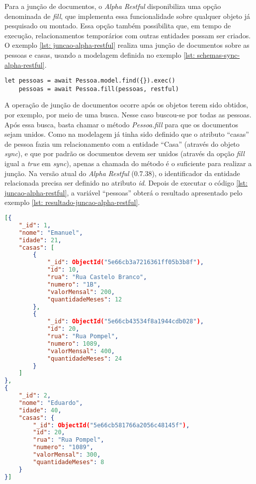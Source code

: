 Para a junção de documentos, o \textit{Alpha Restful} disponibiliza uma opção denominada de \textit{fill}, que implementa essa funcionalidade sobre qualquer objeto já pesquisado ou montado. Essa opção também possibilita que, em tempo de execução, relacionamentos temporários com outras entidades possam ser criados. O exemplo \ref{lst: juncao-alpha-restful} realiza uma junção de documentos sobre as pessoas e casas, usando a modelagem definida no exemplo \ref{lst: schemas-sync-alpha-restful}.

\begin{lstlisting}[style=ES6, caption={Junção de Documentos Com o \textit{Alpha Restful}\label{lst: juncao-alpha-restful}}]
	let pessoas = await Pessoa.model.find({}).exec()
	pessoas = await Pessoa.fill(pessoas, restful)
\end{lstlisting}

A operação de junção de documentos ocorre após os objetos terem sido obtidos, por exemplo, por meio de uma busca. Nesse caso buscou-se por todas as pessoas. Após essa busca, basta chamar o método \textit{Pessoa.fill} para que os documentos sejam unidos. Como na modelagem já tinha sido definido que o atributo ``casas'' de pessoa fazia um relacionamento com a entidade ``Casa'' (através do objeto \textit{sync}), e que por padrão os documentos devem ser unidos (através da opção \textit{fill} igual a \textit{true} em \textit{sync}), apenas a chamada do método é o suficiente para realizar a junção. Na versão atual do \textit{Alpha Restful} (0.7.38), o identificador da entidade relacionada precisa ser definido no atributo \textit{id}. Depois de executar o código \ref{lst: juncao-alpha-restful}, a variável ``pessoas'' obterá o resultado apresentado pelo exemplo \ref{lst: resultado-juncao-alpha-restful}.


\begin{lstlisting}[language=json, caption={Resultado da Junção de Documentos Com o \textit{Alpha Restful}\label{lst: resultado-juncao-alpha-restful}}]
[{
    "_id": 1,
    "nome": "Emanuel",
    "idade": 21,
    "casas": [
        {
            "_id": ObjectId("5e66cb3a7216361ff05b3b8f"),
            "id": 10,
            "rua": "Rua Castelo Branco",
            "numero": "1B",
            "valorMensal": 200,
            "quantidadeMeses": 12
        },
        {
            "_id": ObjectId("5e66cb43534f8a1944cdb028"),
            "id": 20,
            "rua": "Rua Pompel",
            "numero": 1089,
            "valorMensal": 400,
            "quantidadeMeses": 24
        }
    ]
},
{
    "_id": 2,
    "nome": "Eduardo",
    "idade": 40,
    "casas": {
        "_id": ObjectId("5e66cb581766a2056c48145f"),
        "id": 20,
        "rua": "Rua Pompel",
        "numero": "1089",
        "valorMensal": 300,
        "quantidadeMeses": 8
    }
}]
\end{lstlisting}

